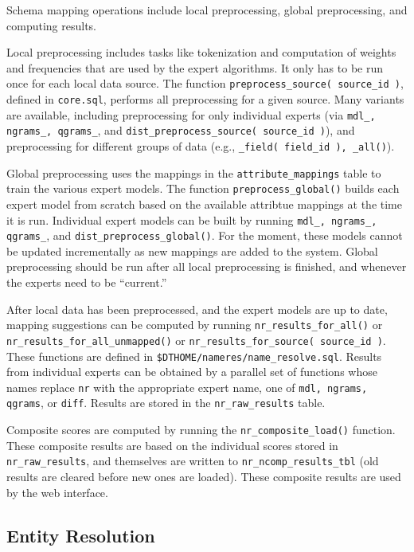 \documentclass[12pt]{article}
\begin{document}
Schema mapping operations include local preprocessing, global preprocessing, and computing results.

Local preprocessing includes tasks like tokenization and computation of weights and frequencies that are used by the expert algorithms.  It only has to be run once for each local data source.  The function \texttt{preprocess\_source( source\_id )}, defined in \texttt{core.sql}, performs all preprocessing for a given source.  Many variants are available, including preprocessing for only individual experts (via \texttt{mdl\_, ngrams\_, qgrams\_}, and \texttt{dist\_preprocess\_source( source\_id )}), and preprocessing for different groups of data (e.g., \texttt{\_field( field\_id ), \_all()}).

Global preprocessing uses the mappings in the \texttt{attribute\_mappings} table to train the various expert models.  The function \texttt{preprocess\_global()} builds each expert model from scratch based on the available attribtue mappings at the time it is run.  Individual expert models can be built by running \texttt{mdl\_, ngrams\_, qgrams\_}, and \texttt{dist\_preprocess\_global()}.  For the moment, these models cannot be updated incrementally as new mappings are added to the system.  Global preprocessing should be run after all local preprocessing is finished, and whenever the experts need to be ``current.''

After local data has been preprocessed, and the expert models are up to date, mapping suggestions can be computed by running \texttt{nr\_results\_for\_all()} or \texttt{nr\_results\_for\_all\_unmapped()} or \texttt{nr\_results\_for\_source( source\_id )}.  These functions are defined in \texttt{\$DTHOME/nameres/name\_resolve.sql}.  Results from individual experts can be obtained by a parallel set of functions whose names replace \texttt{nr} with the appropriate expert name, one of \texttt{mdl, ngrams, qgrams}, or \texttt{diff}.  Results are stored in the \texttt{nr\_raw\_results} table. 

Composite scores are computed by running the \texttt{nr\_composite\_load()} function.  These composite results are based on the individual scores stored in \texttt{nr\_raw\_results}, and themselves are written to \texttt{nr\_ncomp\_results\_tbl} (old results are cleared before new ones are loaded).  These composite results are used by the web interface.


\subsection{Entity Resolution}
\end{document}
